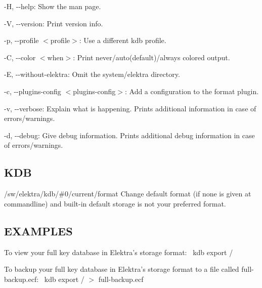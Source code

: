 \begin{DoxyItemize}
\item {\ttfamily -\/H}, {\ttfamily -\/-\/help}\+: Show the man page.
\item {\ttfamily -\/V}, {\ttfamily -\/-\/version}\+: Print version info.
\item {\ttfamily -\/p}, {\ttfamily -\/-\/profile $<$profile$>$}\+: Use a different kdb profile.
\item {\ttfamily -\/C}, {\ttfamily -\/-\/color $<$when$>$}\+: Print never/auto(default)/always colored output.
\item {\ttfamily -\/E}, {\ttfamily -\/-\/without-\/elektra}\+: Omit the {\ttfamily system/elektra} directory.
\item {\ttfamily -\/c}, {\ttfamily -\/-\/plugins-\/config $<$plugins-\/config$>$}\+: Add a configuration to the format plugin.
\item {\ttfamily -\/v}, {\ttfamily -\/-\/verbose}\+: Explain what is happening. Prints additional information in case of errors/warnings.
\item {\ttfamily -\/d}, {\ttfamily -\/-\/debug}\+: Give debug information. Prints additional debug information in case of errors/warnings.
\end{DoxyItemize}

\subsection*{K\+DB}


\begin{DoxyItemize}
\item {\ttfamily /sw/elektra/kdb/\#0/current/format} Change default format (if none is given at commandline) and built-\/in default {\ttfamily storage} is not your preferred format.
\end{DoxyItemize}

\subsection*{E\+X\+A\+M\+P\+L\+ES}

To view your full key database in Elektra’s {\ttfamily storage} format\+:~\newline
 {\ttfamily kdb export /}~\newline


To backup your full key database in Elektra’s {\ttfamily storage} format to a file called {\ttfamily full-\/backup.\+ecf}\+:~\newline
 {\ttfamily kdb export / $>$ full-\/backup.\+ecf}~\newline


